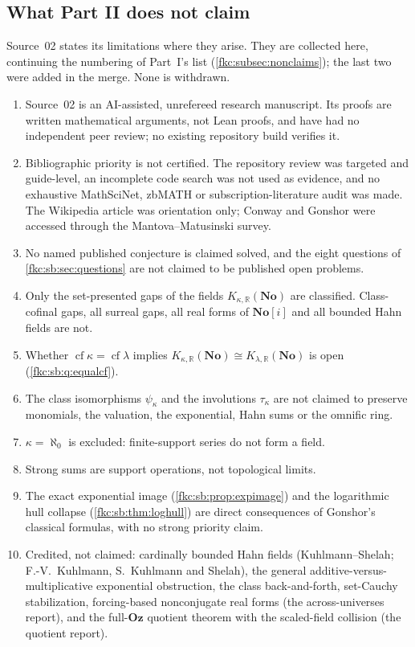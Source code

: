 \documentclass[11pt,letterpaper]{article}
\numberwithin{equation}{section}
\theoremstyle{definition}
\theoremstyle{remark}
\newcommand{\R}{\mathbb R}
\newcommand{\No}{\mathbf{No}}
\newcommand{\cf}{\operatorname{cf}}
\newcommand{\Oz}{\mathbf{Oz}}
\newcommand{\SC}{\mathbf{No}[i]}
\newcommand{\KN}[2]{K_{#1,#2}(\No)}%
\begin{document}
\subsection{What Part II does not claim}
\label{fkc:sb:sub:nonclaims}
Source~02 states its limitations where they arise. They are collected here, continuing the numbering of Part~I's list (\cref{fkc:subsec:nonclaims}); the last two were added in the merge. None is withdrawn.
\begin{enumerate}[label=\textup{N\arabic*.}, leftmargin=2.8em, start=13]
\item Source~02 is an AI-assisted, unrefereed research manuscript. Its proofs are written mathematical arguments, not Lean proofs, and have had no independent peer review; no existing repository build verifies it.
\item Bibliographic priority is not certified. The repository review was targeted and guide-level, an incomplete code search was not used as evidence, and no exhaustive MathSciNet, zbMATH or subscription-literature audit was made. The Wikipedia article was orientation only; Conway and Gonshor were accessed through the Mantova--Matusinski survey.
\item No named published conjecture is claimed solved, and the eight questions of \cref{fkc:sb:sec:questions} are not claimed to be published open problems.
\item Only the set-presented gaps of the fields $\KN\kappa\R$ are classified. Class-cofinal gaps, all surreal gaps, all real forms of $\SC$ and all bounded Hahn fields are not.
\item Whether $\cf\kappa=\cf\lambda$ implies $\KN\kappa\R\cong\KN\lambda\R$ is open (\cref{fkc:sb:q:equalcf}).
\item The class isomorphisms $\psi_\kappa$ and the involutions $\tau_\kappa$ are not claimed to preserve monomials, the valuation, the exponential, Hahn sums or the omnific ring.
\item $\kappa=\aleph_0$ is excluded: finite-support series do not form a field.
\item Strong sums are support operations, not topological limits.
\item The exact exponential image (\cref{fkc:sb:prop:expimage}) and the logarithmic hull collapse (\cref{fkc:sb:thm:loghull}) are direct consequences of Gonshor's classical formulas, with no strong priority claim.
\item Credited, not claimed: cardinally bounded Hahn fields (Kuhlmann--Shelah; F.-V.~Kuhlmann, S.~Kuhlmann and Shelah), the general additive-versus-multiplicative exponential obstruction, the class back-and-forth, set-Cauchy stabilization, forcing-based nonconjugate real forms (the across-universes report), and the full-$\Oz$ quotient theorem with the scaled-field collision (the quotient report).

\end{enumerate}
\end{document}
